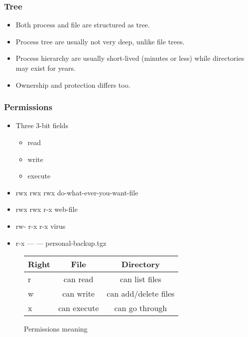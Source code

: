   \begin{frame}
    \frametitle{Tree}
      \begin{itemize}
        \item Both process and file are structured as tree.
        \item Process tree are usually not very deep, unlike file trees.
        \item Process hierarchy are usually short-lived (minutes or less) while directories may exist for years.
        \item Ownership and protection differs too.
      \end{itemize}
  \end{frame}

  \begin{frame}
    \frametitle{Permissions}
      \begin{itemize}
        \item Three 3-bit fields
          \begin{itemize}
            \item r{\color{gray}ead}
            \item w{\color{gray}rite}
            \item {\color{gray}e}x{\color{gray}ecute}
          \end{itemize}
        \item {\color{OliveGreen}rwx} {\color{Marroon}rwx} {\color{fuchsia}rwx} do-what-ever-you-want-file
        \item {\color{OliveGreen}rwx} {\color{Marroon}rwx} {\color{fuchsia}r-x} web-file
        \item {\color{OliveGreen}rw-} {\color{Marroon}r-x} {\color{fuchsia}r-x} virus
        \item {\color{OliveGreen}r-x} {\color{Marroon}---} {\color{fuchsia}---} personal-backup.tgz
      \end{itemize}
    \begin{figure}
      \centering
      \begin{tabular}{l|c|c}
        Right  & File  & Directory \\ \hline
        r & can read   & can list files \\ \hline
        w & can write  & can add/delete files \\ \hline
        x & can execute& can go through \\ \hline
      \end{tabular}
      \caption{Permissions meaning}
      \label{fig:tab-right}
    \end{figure}
  \end{frame}


